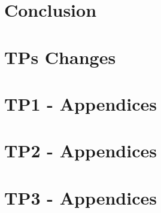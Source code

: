 \documentclass[11pt]{report}
\begin{document}
\chapter*{Conclusion}


\appendix
\chapter{TPs Changes}

\chapter{TP1 - Appendices}

\chapter{TP2 - Appendices}

\chapter{TP3 - Appendices}



\printbibliography
\end{document}
